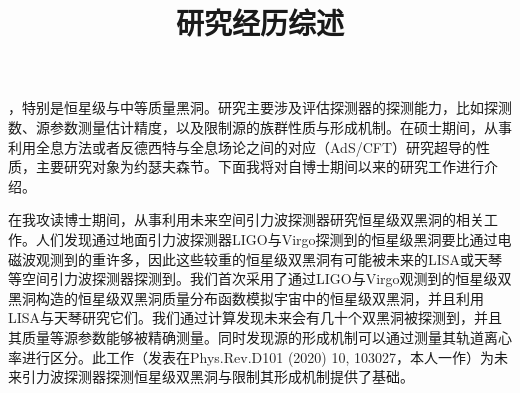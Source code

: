 \documentclass[12pt,a4paper,sans]{article}%
\title{\vspace{-2.5cm}\Huge 研究经历综述 \vspace{-2.2em}}
\date{}
\begin{document}
\begin{CJK}{UTF8}{gbsn}
\maketitle
，特别是恒星级与中等质量黑洞。研究主要涉及评估探测器的探测能力，比如探测数、源参数测量估计精度，以及限制源的族群性质与形成机制。在硕士期间，从事利用全息方法或者反德西特与全息场论之间的对应（AdS/CFT）研究超导的性质，主要研究对象为约瑟夫森节。下面我将对自博士期间以来的研究工作进行介绍。

在我攻读博士期间，从事利用未来空间引力波探测器研究恒星级双黑洞的相关工作。人们发现通过地面引力波探测器LIGO与Virgo探测到的恒星级黑洞要比通过电磁波观测到的重许多，因此这些较重的恒星级双黑洞有可能被未来的LISA或天琴等空间引力波探测器探测到。我们首次采用了通过LIGO与Virgo观测到的恒星级双黑洞构造的恒星级双黑洞质量分布函数模拟宇宙中的恒星级双黑洞，并且利用LISA与天琴研究它们。我们通过计算发现未来会有几十个双黑洞被探测到，并且其质量等源参数能够被精确测量。同时发现源的形成机制可以通过测量其轨道离心率进行区分。此工作（发表在Phys.Rev.D101 (2020) 10, 103027，本人一作）为未来引力波探测器探测恒星级双黑洞与限制其形成机制提供了基础。


\end{CJK}
\end{document}
